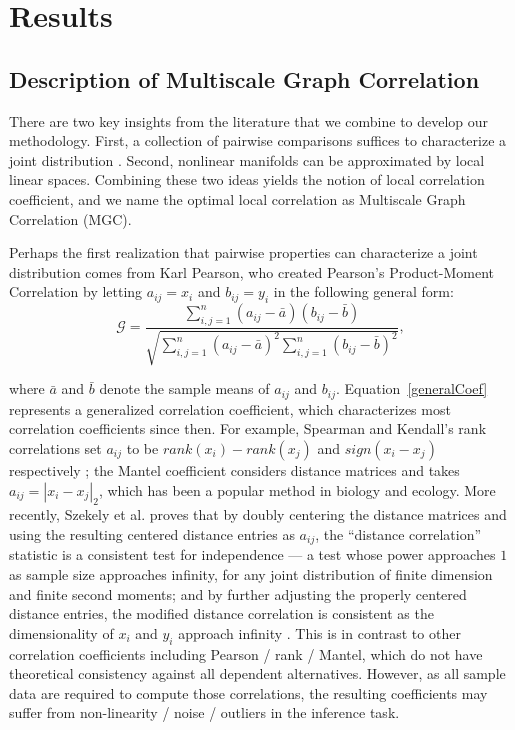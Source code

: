 \documentclass[11pt]{article}
\newcommand{\G}{\mathcal{G}}
\begin{document}
\section{Results}
\label{main}
\subsection{Description of Multiscale Graph Correlation}
\label{main1}
There are two key insights from the literature that we combine to develop our methodology.  First, a collection of pairwise comparisons  suffices to characterize a joint distribution \cite{Maa1996}.  Second, nonlinear manifolds can be approximated by local linear spaces.  Combining these two ideas yields the notion of local correlation coefficient, and we name the optimal local correlation as Multiscale Graph Correlation (MGC).  

Perhaps the first realization that pairwise properties can characterize a joint distribution comes from  Karl Pearson, who created Pearson's Product-Moment Correlation \cite{Pearson1895} by letting $a_{ij}=x_i$ and $b_{ij}=y_i$ in the following general form:
\begin{equation}
\label{generalCoef}
\G=\frac{\sum_{i,j=1}^n (a_{ij}-\bar{a}) (b_{ij}-\bar{b})}{\sqrt{\sum_{i,j=1}^n  (a_{ij}-\bar{a})^{2} \sum_{i,j=1}^n (b_{ij}-\bar{b})^{2}}}, 
\end{equation}

where $\bar{a}$ and $\bar{b}$ denote the sample means of $a_{ij}$ and $b_{ij}$. Equation~\ref{generalCoef} represents a generalized correlation coefficient, which characterizes most correlation coefficients since then.  For example, Spearman and Kendall's rank correlations set $a_{ij}$ to be $rank(x_i)-rank(x_j)$ and $sign(x_i-x_j)$ respectively \cite{KendallBook}; the Mantel coefficient \cite{Mantel1967} considers distance matrices and takes $a_{ij}=|x_i-x_j|_{2}$, which has been a popular method in biology and ecology. More recently, Szekely et al. \cite{SzekelyRizzoBakirov2007} proves that by doubly centering the distance matrices and using the resulting centered distance entries as $a_{ij}$, the ``distance correlation'' statistic is a consistent test for independence --- a test whose power approaches $1$ as sample size approaches infinity, for any joint distribution of finite dimension and finite second moments; and by further adjusting the properly centered distance entries, the modified distance correlation is consistent as the dimensionality of $x_{i}$ and $y_{i}$ approach infinity \cite{SzekelyRizzo2013a}. This is in contrast to other correlation coefficients including Pearson / rank / Mantel, which do not have theoretical consistency against all dependent alternatives. However, as all sample data are required to compute those correlations, the resulting coefficients may suffer from non-linearity / noise / outliers in the inference task.
\end{document}
